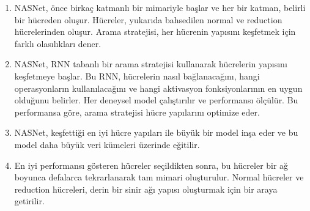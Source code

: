 \begin{enumerate}
    \item NASNet, önce birkaç katmanlı bir mimariyle başlar ve her bir katman, belirli bir hücreden oluşur. Hücreler, yukarıda bahsedilen normal ve reduction hücrelerinden oluşur. Arama stratejisi, her hücrenin yapısını keşfetmek için farklı olasılıkları dener.
    \item NASNet, RNN tabanlı bir arama stratejisi kullanarak hücrelerin yapısını keşfetmeye başlar. Bu RNN, hücrelerin nasıl bağlanacağını, hangi operasyonların kullanılacağını ve hangi aktivasyon fonksiyonlarının en uygun olduğunu belirler. Her deneysel model çalıştırılır ve performansı ölçülür. Bu performansa göre, arama stratejisi hücre yapılarını optimize eder.
    \item NASNet, keşfettiği en iyi hücre yapıları ile büyük bir model inşa eder ve bu model daha büyük veri kümeleri üzerinde eğitilir.
    \item En iyi performansı gösteren hücreler seçildikten sonra, bu hücreler bir ağ boyunca defalarca tekrarlanarak tam mimari oluşturulur. Normal hücreler ve reduction hücreleri, derin bir sinir ağı yapısı oluşturmak için bir araya getirilir.
\end{enumerate}

\newpage